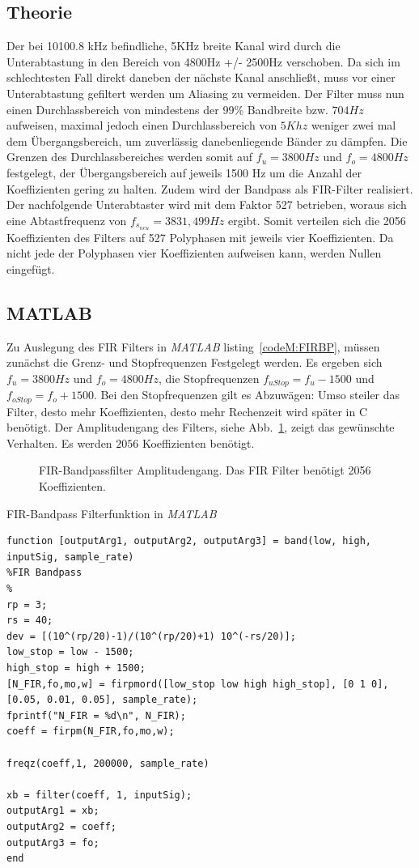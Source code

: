 \documentclass{article}
\begin{document}
\subsection{Theorie}
Der bei 10100.8 kHz befindliche, 5KHz breite Kanal wird durch die Unterabtastung in den 
Bereich von 4800Hz +/- 2500Hz verschoben. 
Da sich im schlechtesten Fall direkt daneben der nächste Kanal anschließt, muss vor einer Unterabtastung gefiltert werden um Aliasing zu vermeiden. 
Der Filter muss nun einen Durchlassbereich von mindestens der 99\% Bandbreite bzw. $704Hz$ aufweisen, maximal 
jedoch einen Durchlassbereich von $5Khz$ weniger zwei mal dem Übergangsbereich, um zuverlässig danebenliegende Bänder zu dämpfen. 
Die Grenzen des Durchlassbereiches werden somit auf $f_u = 3800Hz$ und $f_o = 4800Hz$ festgelegt, der Übergangsbereich auf jeweils 1500 Hz um die
Anzahl der Koeffizienten gering zu halten. Zudem wird der Bandpass als FIR-Filter realisiert. Der nachfolgende Unterabtaster 
wird mit dem Faktor 527 betrieben, woraus sich eine Abtastfrequenz von $f_{s_{neu}} = 3831,499Hz$ ergibt. Somit verteilen sich die 
2056 Koeffizienten des Filters auf 527 Polyphasen mit jeweils vier Koeffizienten. Da nicht jede der Polyphasen vier Koeffizienten aufweisen kann, 
werden Nullen eingefügt.

\subsection{MATLAB}
Zu Auslegung des FIR Filters in \textit{MATLAB} listing~\ref{codeM:FIRBP}, müssen zunächst die Grenz- und Stopfrequenzen Festgelegt werden.
Es ergeben sich $f_u = 3800Hz$ und $f_o = 4800Hz$, die Stopfrequenzen $f_{uStop} = f_u - 1500$ und $f_{oStop} = f_o + 1500$.
Bei den Stopfrequenzen gilt es Abzuwägen: Umso steiler das Filter, desto mehr Koeffizienten, desto mehr Rechenzeit wird später in C
benötigt. Der Amplitudengang des Filters, siehe Abb.~\ref{fig:fir_ampli}, zeigt das gewünschte Verhalten. Es werden $2056$ Koeffizienten benötigt.

\begin{figure}[!h]
    \label{fig:fir_ampli}
    \centering
    \def\svgscale{0.3}
    \def\svgwidth{\columnwidth}
    
    \caption{FIR-Bandpassfilter Amplitudengang. Das FIR Filter benötigt 2056 Koeffizienten.}
\end{figure}
\begin{listing}\label{codeM:FIRBP}
    \caption{FIR-Bandpass Filterfunktion in \textit{MATLAB}}
    \begin{verbatim}
function [outputArg1, outputArg2, outputArg3] = band(low, high, inputSig, sample_rate)
%FIR Bandpass
%
rp = 3; 
rs = 40;
dev = [(10^(rp/20)-1)/(10^(rp/20)+1) 10^(-rs/20)]; 
low_stop = low - 1500;
high_stop = high + 1500;
[N_FIR,fo,mo,w] = firpmord([low_stop low high high_stop], [0 1 0], [0.05, 0.01, 0.05], sample_rate);
fprintf("N_FIR = %d\n", N_FIR);
coeff = firpm(N_FIR,fo,mo,w);

freqz(coeff,1, 200000, sample_rate)

xb = filter(coeff, 1, inputSig);
outputArg1 = xb;
outputArg2 = coeff;
outputArg3 = fo;
end
    \end{verbatim}
\end{listing}
\end{document}
